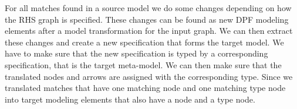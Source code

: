 For all matches found in a source model we do some changes depending on how the
RHS graph is specified. These changes can be found as new DPF modeling elements
after a model transformation for the input graph. We can then extract these
changes and create a new specification that forms the target model. We have to
make sure that the new specification is typed by a corresponding specification,
that is the target meta-model. We can then make sure that the translated
nodes and arrows are assigned with the corresponding type. Since we translated
matches that have one matching node and one matching type node into target
modeling elements that also have a node and a type node.




